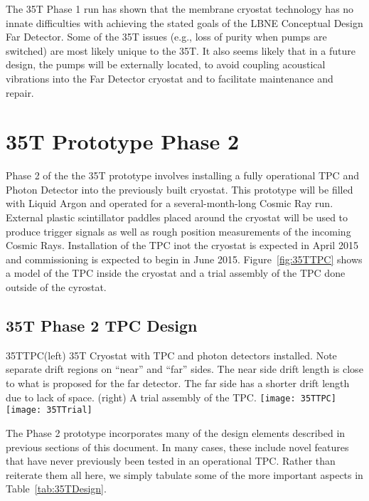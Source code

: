 The 35T Phase 1 run has shown that the membrane cryostat technology has no innate difficulties with 
achieving the stated goals of the LBNE Conceptual Design Far Detector. Some of the 35T issues (e.g., loss 
of purity when pumps are switched) are most likely unique to the 35T. It also seems likely that in a future 
design, the pumps will be externally located, to avoid coupling acoustical vibrations into the Far Detector 
cryostat and to facilitate maintenance and repair.

\section{35T Prototype Phase 2}

Phase 2 of the the 35T prototype involves installing a fully operational TPC and Photon Detector into 
the previously built cryostat.
This prototype will be filled with Liquid Argon and operated for a several-month-long Cosmic Ray run. 
External plastic scintillator paddles placed around the cryostat will be used to produce
trigger signals as well as rough position measurements of the incoming Cosmic Rays.
Installation of the TPC inot the cryostat is expected in April 2015 and 
commissioning is expected to begin in June 2015.
Figure~\ref{fig:35TTPC} shows a model of the TPC inside the cryostat and a trial assembly of
the TPC done outside of the cyrostat. 

\subsection{35T Phase 2 TPC Design}

\begin{cdrfigure}{35TTPC}{(left) 35T Cryostat with TPC and photon detectors installed. 
Note separate drift regions on ``near'' and ``far'' sides.
The near side drift length is close to what is proposed for the far detector. The far
side has a shorter drift length due to lack of space.
(right) A trial assembly of the TPC.
}
\texttt{[image: 35TTPC]}  
\texttt{[image: 35TTrial]}  
\end{cdrfigure}

The Phase 2 prototype incorporates many of the design elements described in previous
sections of this document.
In many cases, these include novel features that have never previously been tested
in an operational TPC.
Rather than reiterate them all here, we simply tabulate some of the more important
aspects in Table~\ref{tab:35TDesign}.

